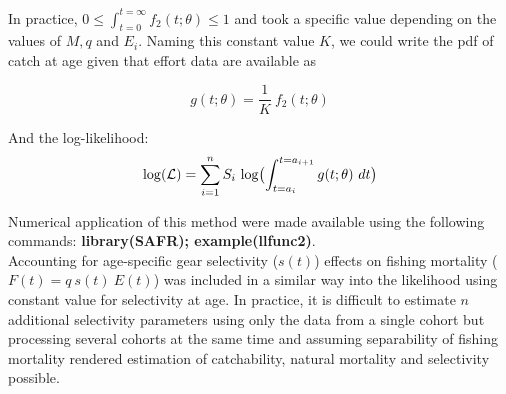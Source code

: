 In practice, $ 0 \leq \int_{t=0}^{t=\infty} f_{2}(t; \theta) \leq 1$ and took a specific value depending on the values of $M, q $ and $E_{i}$. Naming this constant value $K$, we could write the pdf of catch at age given that effort data are available as

\begin{equation}
g(t; \theta) = \frac{1}{K} \ f_{2}(t; \theta)
\end{equation}

And the log-likelihood:
\begin{equation}
{\rm log}(\mathcal{L}) = \sum_{i=1}^{n} S_{i} \ {\rm log} \bigl ( \int_{t=a_{i}}^{t=a_{i+1}} g(t; \theta) \ dt \bigr )
\end{equation}

Numerical application of this method were made available using the following commands: {\bf library(SAFR); example(llfunc2)}.\\

Accounting for age-specific gear selectivity ($s(t)$) effects on fishing mortality ($F(t) = q \ s(t) \ E(t)$) was included in a similar way into the likelihood using constant value for selectivity at age. In practice, it is difficult to estimate $n$ additional selectivity parameters using only the data from a single cohort but processing several cohorts at the same time and assuming separability of fishing mortality rendered estimation of catchability, natural mortality and selectivity possible.
